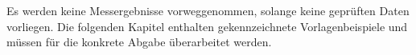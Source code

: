 \begin{MCISummary}
Es werden keine Messergebnisse vorweggenommen, solange keine geprüften
Daten vorliegen. Die folgenden Kapitel enthalten gekennzeichnete
Vorlagenbeispiele und müssen für die konkrete Abgabe überarbeitet werden.
\end{MCISummary}
